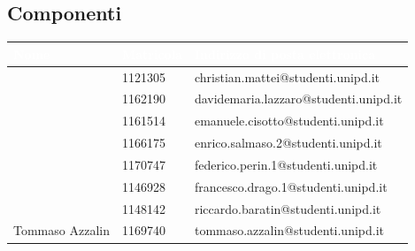 \clearpage
\subsection{Componenti}
{
	\renewcommand{\arraystretch}{2}
	\begin{longtable}{ C{4cm} C{2cm} C{8cm} }
		\textcolor{white}{\textbf{Nome}} & \textcolor{white}{\textbf{Matricola}} & \textcolor{white}{\textbf{Indirizzo di posta elettronica}}\\\endhead	
		
		\MC & 1121305 & christian.mattei@studenti.unipd.it \\
		\LD & 1162190 & davidemaria.lazzaro@studenti.unipd.it\\
		\CE & 1161514 & emanuele.cisotto@studenti.unipd.it\\
		\SE & 1166175 & enrico.salmaso.2@studenti.unipd.it \\
		\PF & 1170747 & federico.perin.1@studenti.unipd.it \\
		\DF & 1146928 & francesco.drago.1@studenti.unipd.it \\
		\BR & 1148142 & riccardo.baratin@studenti.unipd.it \\
		Tommaso Azzalin & 1169740 & tommaso.azzalin@studenti.unipd.it \\
		
		
	\end{longtable}
}